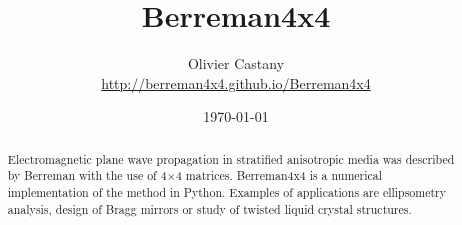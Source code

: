 \documentclass[a4paper, 10pt, oneside, twocolumn, openany]{memoir}
\begin{document}
\begin{titlingpage}

\pretitle{\begin{center}\Huge\sffamily\bfseries}
\posttitle{\par\end{center}\vskip 3.5cm}

\postauthor{\end{tabular}\par}

\postdate{\end{tabular}\par\vskip 1cm}

\usethanksrule
\thanksheadextra{(}{)}

\setlength{\absparindent}{0pt}
\makeatletter\renewcommand{\absnamepos}{@bstr@ctlist}\makeatother
\renewcommand{\abstractnamefont}{\normalfont\bfseries}
\renewcommand{\abstracttextfont}{\normalfont}

\title{Berreman4x4}

\author{\textsf{Olivier Castany}\\
    \href{http://berreman4x4.github.io/Berreman4x4}%
         {http://berreman4x4.github.io/Berreman4x4}
}

\date{\today}

\maketitle

\begin{abstract}
Electromagnetic plane wave propagation in stratified anisotropic media was described by Berreman with the use of 4$\times$4 matrices.
Berreman4x4 is a numerical implementation of the method in Python.
Examples of applications are ellipsometry analysis, design of Bragg mirrors or study of twisted liquid crystal structures.
\end{abstract}

\end{titlingpage}









\end{document}
